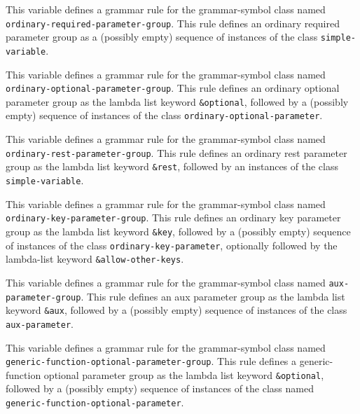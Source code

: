 
This variable defines a grammar rule for the grammar-symbol class
named \texttt{ordinary-required-parameter-group}.  This rule defines
an ordinary required parameter group as a (possibly empty) sequence of
instances of the class \texttt{simple-variable}.


This variable defines a grammar rule for the grammar-symbol class
named \texttt{ordinary-optional-parameter-group}.  This rule defines
an ordinary optional parameter group as the lambda list keyword
\texttt{\&optional}, followed by a (possibly empty) sequence of
instances of the class \texttt{ordinary-optional-parameter}.


This variable defines a grammar rule for the grammar-symbol class
named \texttt{ordinary-rest-parameter-group}.  This rule defines an
ordinary rest parameter group as the lambda list keyword
\texttt{\&rest}, followed by an instances of the class
\texttt{simple-variable}.


This variable defines a grammar rule for the grammar-symbol class
named \texttt{ordinary-key-parameter-group}.  This rule defines
an ordinary key parameter group as the lambda list keyword
\texttt{\&key}, followed by a (possibly empty) sequence of
instances of the class \texttt{ordinary-key-parameter}, optionally
followed by the lambda-list keyword \texttt{\&allow-other-keys}.


This variable defines a grammar rule for the grammar-symbol class
named \texttt{aux-parameter-group}.  This rule defines an aux
parameter group as the lambda list keyword \texttt{\&aux}, followed by
a (possibly empty) sequence of instances of the class
\texttt{aux-parameter}.


This variable defines a grammar rule for the grammar-symbol class
named \texttt{generic-function-optional-parameter-group}.  This rule
defines a generic-function optional parameter group as the lambda list
keyword \texttt{\&optional}, followed by a (possibly empty) sequence
of instances of the class named\\
\texttt{generic-function-optional-parameter}.

